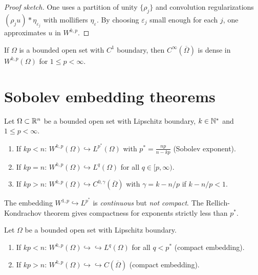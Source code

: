 \begin{proof}[Proof sketch]
One uses a partition of unity $\{\rho_j\}$ and convolution regularizations
$(\rho_j u) * \eta_{\varepsilon_j}$ with mollifiers $\eta_\varepsilon$. By
choosing $\varepsilon_j$ small enough for each $j$, one approximates $u$ in
$W^{k,p}$.
\end{proof}

\begin{theorem}
If $\Omega$ is a bounded open set with $C^1$ boundary, then
$C^\infty(\overline{\Omega})$ is dense in $W^{k,p}(\Omega)$ for $1 \leq p < \infty$.
\end{theorem}

\section{Sobolev embedding theorems}

\begin{theorem}
\label{thm:sobolev_embedding}
Let $\Omega \subset \mathbb{R}^n$ be a bounded open set with Lipschitz boundary,
$k \in \mathbb{N}^*$ and $1 \leq p < \infty$.
\begin{enumerate}
    \item If $kp < n$: $W^{k,p}(\Omega) \hookrightarrow L^{p^*}(\Omega)$
          with $p^* = \frac{np}{n - kp}$ (Sobolev exponent).
    \item If $kp = n$: $W^{k,p}(\Omega) \hookrightarrow L^q(\Omega)$
          for all $q \in [p, \infty)$.
    \item If $kp > n$: $W^{k,p}(\Omega) \hookrightarrow C^{0,\gamma}(\overline{\Omega})$
          with $\gamma = k - n/p$ if $k - n/p < 1$.
\end{enumerate}
\end{theorem}

\begin{warning}[title=\textbf{The critical exponent}]
The embedding $W^{1,p} \hookrightarrow L^{p^*}$ is \emph{continuous} but
\emph{not compact}. The Rellich-Kondrachov theorem gives compactness for
exponents strictly less than $p^*$.
\end{warning}

\begin{theorem}
\label{thm:rellich}
Let $\Omega$ be a bounded open set with Lipschitz boundary.
\begin{enumerate}
    \item If $kp < n$: $W^{k,p}(\Omega) \hookrightarrow\hookrightarrow L^q(\Omega)$
          for all $q < p^*$ (compact embedding).
    \item If $kp > n$: $W^{k,p}(\Omega) \hookrightarrow\hookrightarrow C(\overline{\Omega})$
          (compact embedding).
\end{enumerate}
\end{theorem}

